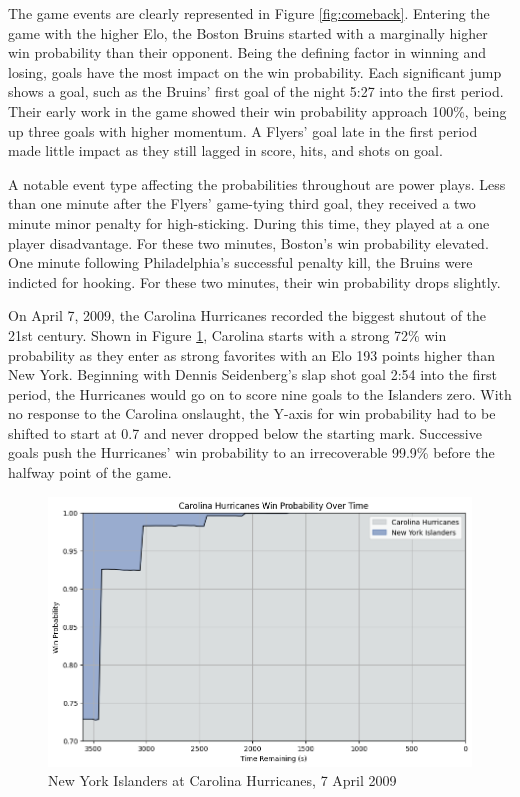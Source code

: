 \documentclass{article}
\begin{document}
The game events are clearly represented in Figure \ref{fig:comeback}.
Entering the game with the higher Elo, the Boston Bruins started with a marginally higher win probability than their opponent.
Being the defining factor in winning and losing, goals have the most impact on the win probability.
Each significant jump shows a goal, such as the Bruins' first goal of the night 5:27 into the first period.
Their early work in the game showed their win probability approach 100\%, being up three goals with higher momentum.
A Flyers' goal late in the first period made little impact as they still lagged in score, hits, and shots on goal.

A notable event type affecting the probabilities throughout are power plays.
Less than one minute after the Flyers' game-tying third goal, they received a two minute minor penalty for high-sticking.
During this time, they played at a one player disadvantage.
For these two minutes, Boston's win probability elevated.
One minute following Philadelphia's successful penalty kill, the Bruins were indicted for hooking.
For these two minutes, their win probability drops slightly.

On April 7, 2009, the Carolina Hurricanes recorded the biggest shutout of the 21st century.
Shown in Figure \ref{fig:shutout}, Carolina starts with a strong 72\% win probability as they enter as strong favorites with an Elo 193 points higher than New York.
Beginning with Dennis Seidenberg's slap shot goal 2:54 into the first period, the Hurricanes would go on to score nine goals to the Islanders zero.
With no response to the Carolina onslaught, the Y-axis for win probability had to be shifted to start at 0.7 and never dropped below the starting mark.
Successive goals push the Hurricanes' win probability to an irrecoverable 99.9\% before the halfway point of the game.

\begin{figure}
    \centering
    \includegraphics[width=1.0\linewidth]{2008021187.png}
    \caption{New York Islanders at Carolina Hurricanes, 7 April 2009}
    \label{fig:shutout}
\end{figure}
\end{document}
